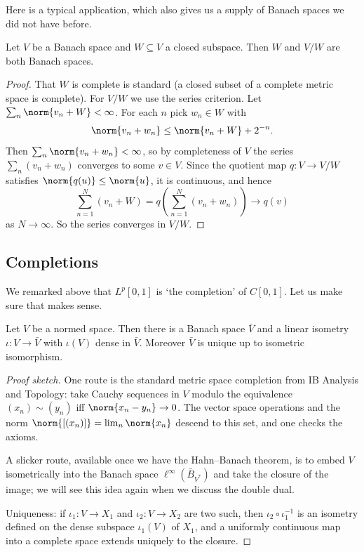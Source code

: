 \documentclass[a4paper]{scrartcl}
\begin{document}
Here is a typical application, which also gives us a supply of Banach spaces we did not have before.

\begin{proposition}
	Let $V$ be a Banach space and $W \subseteq V$ a closed subspace. Then $W$ and $V/W$ are both Banach spaces.
\end{proposition}

\begin{proof}
	That $W$ is complete is standard (a closed subset of a complete metric space is complete). For $V/W$ we use the series criterion. Let $\sum_n \norm{v_n + W} < \infty$. For each $n$ pick $w_n \in W$ with
	$$\norm{v_n + w_n} \leq \norm{v_n + W} + 2^{-n}.$$
	Then $\sum_n \norm{v_n + w_n} < \infty$, so by completeness of $V$ the series $\sum_n (v_n + w_n)$ converges to some $v \in V$. Since the quotient map $q : V \to V/W$ satisfies $\norm{q(u)} \leq \norm{u}$, it is continuous, and hence
	$$\sum_{n=1}^N (v_n + W) = q\left( \sum_{n=1}^N (v_n + w_n) \right) \longrightarrow q(v)$$
	as $N \to \infty$. So the series converges in $V/W$.
\end{proof}

\subsection{Completions}

We remarked above that $L^p[0,1]$ is `the completion' of $C[0,1]$. Let us make sure that makes sense.

\begin{theorem}[Completion]
	Let $V$ be a normed space. Then there is a Banach space $\bar{V}$ and a linear isometry $\iota : V \to \bar{V}$ with $\iota(V)$ dense in $\bar{V}$. Moreover $\bar{V}$ is unique up to isometric isomorphism.
\end{theorem}

\begin{proof}[Proof sketch]
	One route is the standard metric space completion from IB Analysis and Topology: take Cauchy sequences in $V$ modulo the equivalence $(x_n) \sim (y_n)$ iff $\norm{x_n - y_n} \to 0$. The vector space operations and the norm $\norm{[(x_n)]} = \lim_n \norm{x_n}$ descend to this set, and one checks the axioms.

	A slicker route, available once we have the Hahn--Banach theorem, is to embed $V$ isometrically into the Banach space $\ell^\infty(\bar{B}_{V^*})$ and take the closure of the image; we will see this idea again when we discuss the double dual.

	Uniqueness: if $\iota_1 : V \to X_1$ and $\iota_2 : V \to X_2$ are two such, then $\iota_2 \circ \iota_1^{-1}$ is an isometry defined on the dense subspace $\iota_1(V)$ of $X_1$, and a uniformly continuous map into a complete space extends uniquely to the closure.
\end{proof}
\end{document}
